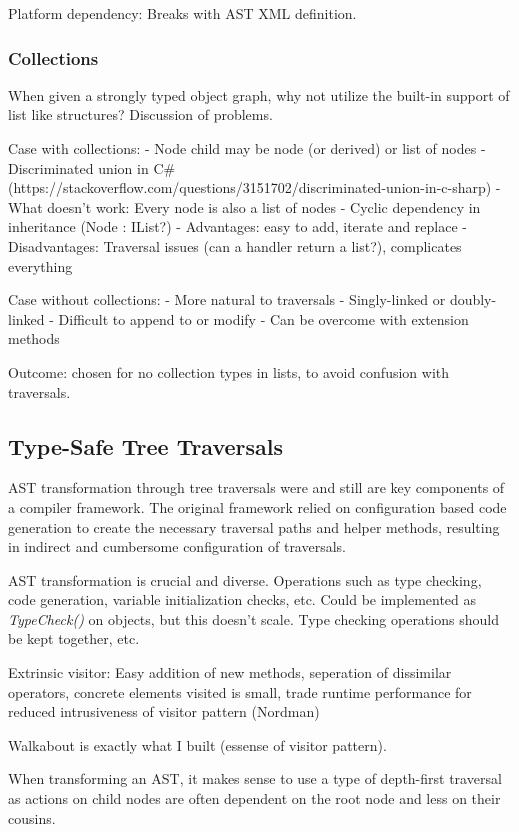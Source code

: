 \documentclass[final,a4paper,12pt]{article}
\begin{document}
Platform dependency: Breaks with AST XML definition.
\subsubsection{Collections}
When given a strongly typed object graph, why not utilize the built-in support of list like structures? Discussion of problems.

Case with collections:
- Node child may be node (or derived) or list of nodes
- Discriminated union in C\# (https://stackoverflow.com/questions/3151702/discriminated-union-in-c-sharp)
- What doesn't work: Every node is also a list of nodes
  - Cyclic dependency in inheritance (Node : IList?)
- Advantages: easy to add, iterate and replace
- Disadvantages: Traversal issues (can a handler return a list?), complicates everything

Case without collections:
- More natural to traversals
- Singly-linked or doubly-linked
- Difficult to append to or modify
  - Can be overcome with extension methods

Outcome: chosen for no collection types in lists, to avoid confusion with traversals.
\subsection{Type-Safe Tree Traversals}
AST transformation through tree traversals were and still are key components of a compiler framework. The original framework relied on configuration based code generation to create the necessary traversal paths and helper methods, resulting in indirect and cumbersome configuration of traversals. 

AST transformation is crucial and diverse. Operations such as type checking, code generation, variable initialization checks, etc. Could be implemented as \textit{TypeCheck()} on objects, but this doesn't scale. Type checking operations should be kept together, etc.

Extrinsic visitor: Easy addition of new methods, seperation of dissimilar operators, concrete elements visited is small, trade runtime performance for reduced intrusiveness of visitor pattern (Nordman)

Walkabout is exactly what I built (essense of visitor pattern).



When transforming an AST, it makes sense to use a type of depth-first traversal as actions on child nodes are often dependent on the root node and less on their cousins.
\end{document}
